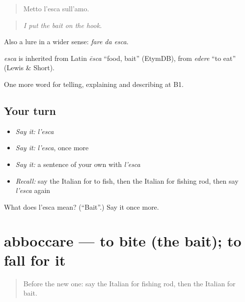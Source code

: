 \begin{quote}
Metto l'esca sull'amo.
\end{quote}

\begin{quote}
\emph{I put the bait on the hook.}
\end{quote}

Also a lure in a wider sense: \emph{fare da esca}.

\begin{cousinweb}
\emph{esca} is inherited from Latin \emph{ēsca} \textquotedblleft{}food, bait\textquotedblright{} (EtymDB), from \emph{edere} \textquotedblleft{}to eat\textquotedblright{} (Lewis \& Short).
\end{cousinweb}

\begin{grammarlens}[title={What you've built}]
One more word for telling, explaining and describing at B1.
\end{grammarlens}

\subsection*{Your turn}
\begin{itemize}
\raggedright
  \item \emph{Say it:} \emph{l'esca}
  \item \emph{Say it:} \emph{l'esca}, once more
  \item \emph{Say it:} a sentence of your own with \emph{l'esca}
  \item \emph{Recall:} say the Italian for to fish, then the Italian for fishing rod, then say \emph{l'esca} again
\end{itemize}

\begin{tcolorbox}[breakable,colback=teal!4,colframe=teal!35!black,title={Before you move on}]
What does l'esca mean? (\textquotedblleft{}Bait\textquotedblright{}.) Say it once more.
\end{tcolorbox}
\section[abboccare]{abboccare — to bite (the bait); to fall for it}

\label{lesson:IT-C501-abboccare}



\begin{quote}
Before the new one: say the Italian for fishing rod, then the Italian for bait.
\end{quote}

